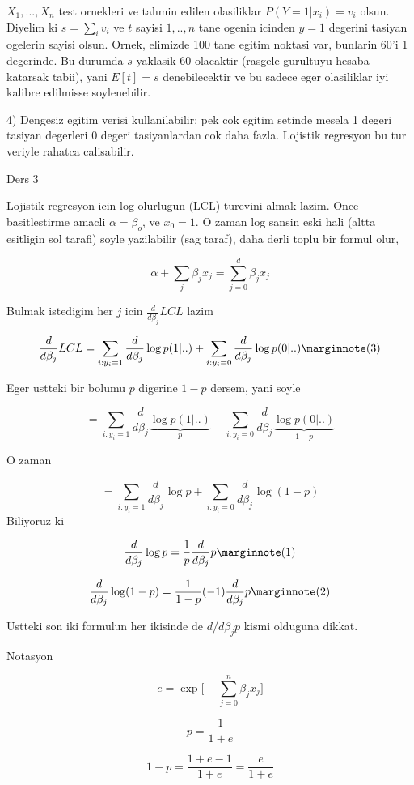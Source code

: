 \documentclass[12pt,fleqn]{article}\usepackage{../common}
\begin{document}
$X_1,...,X_n$ test ornekleri ve tahmin edilen olasiliklar $P(Y=1 | x_i) =
v_i$
olsun. Diyelim ki $s = \sum_i v_i$ ve $t$ sayisi $1,..,n$ tane ogenin
icinden $y = 1$ degerini tasiyan ogelerin sayisi olsun. Ornek, elimizde 100
tane egitim noktasi var, bunlarin 60'i 1 degerinde. Bu durumda $s$ yaklasik
60 olacaktir (rasgele gurultuyu hesaba katarsak tabii), yani  $E[t] =
s$ 
denebilecektir ve bu sadece eger olasiliklar iyi kalibre edilmisse
soylenebilir.

4) Dengesiz egitim verisi kullanilabilir: pek cok egitim setinde mesela 1
degeri tasiyan degerleri 0 degeri tasiyanlardan cok daha fazla. Lojistik
regresyon bu tur veriyle rahatca calisabilir.
 
Ders 3

Lojistik regresyon icin log olurlugun (LCL) turevini almak lazim. Once
basitlestirme amacli $\alpha = \beta_o$, ve $x_0 = 1$. O zaman log sansin
eski hali (altta esitligin sol tarafi) soyle yazilabilir (sag taraf), daha
derli toplu bir formul olur,

$$ \alpha + \sum_j \beta_j x_j  = \sum_{j=0}^{d} \beta_j x_j $$ 

Bulmak istedigim her $j$ icin $\frac{d}{d\beta_j} LCL$ lazim

$$ 
\frac{d}{d\beta_j} LCL = 
\sum _{i:y_i=1} \frac{d}{d\beta_j} \log p(1|..)
+ \sum _{i:y_i=0} \frac{d}{d\beta_j} \log p(0|..)
\mlabel{3}
$$

Eger ustteki bir bolumu $p$ digerine $1-p$ dersem, yani soyle

$$ 
= \sum _{i:y_i=1} \frac{d}{d\beta_j} \underbrace{\log p(1|..)}_{p}
+ \sum _{i:y_i=0} \frac{d}{d\beta_j} \underbrace{\log p(0|..)}_{1-p}
$$

O zaman 


$$ 
= \sum _{i:y_i=1} \frac{d}{d\beta_j}\log p
+ \sum _{i:y_i=0} \frac{d}{d\beta_j} \log (1-p)
$$
Biliyoruz ki

$$ 
\frac{d}{d\beta_j}\log p = \frac{1}{p}\frac{d}{d\beta_j} p
\mlabel{1}
$$

$$ 
\frac{d}{d\beta_j}\log (1-p) = \frac{1}{1-p}(-1)\frac{d}{d\beta_j} p
\mlabel{2}
$$

Ustteki son iki formulun her ikisinde de $d/d\beta_j p$ kismi olduguna dikkat.

Notasyon

$$ e = \exp \big[ - \sum_{j=0}^n \beta_jx_j \big] $$

$$ p = \frac{ 1}{1+e} $$

$$ 1-p = \frac{ 1+e-1}{1+e} = \frac{ e}{1+e} $$
\end{document}
